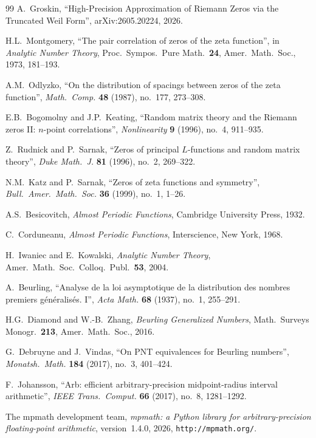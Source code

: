 \documentclass[11pt]{article}
\begin{document}
\begin{thebibliography}{99}
A.~Groskin,
``High-Precision Approximation of Riemann Zeros via the Truncated Weil
Form'',
arXiv:2605.20224, 2026.

H.L.~Montgomery,
``The pair correlation of zeros of the zeta function'',
in \emph{Analytic Number Theory}, Proc.\ Sympos.\ Pure Math.\ \textbf{24},
Amer.\ Math.\ Soc., 1973, 181--193.

A.M.~Odlyzko,
``On the distribution of spacings between zeros of the zeta function'',
\emph{Math.\ Comp.} \textbf{48} (1987), no.~177, 273--308.

E.B.~Bogomolny and J.P.~Keating,
``Random matrix theory and the Riemann zeros II: $n$-point correlations'',
\emph{Nonlinearity} \textbf{9} (1996), no.~4, 911--935.

Z.~Rudnick and P.~Sarnak,
``Zeros of principal $L$-functions and random matrix theory'',
\emph{Duke Math.\ J.} \textbf{81} (1996), no.~2, 269--322.

N.M.~Katz and P.~Sarnak,
``Zeros of zeta functions and symmetry'',
\emph{Bull.\ Amer.\ Math.\ Soc.} \textbf{36} (1999), no.~1, 1--26.

A.S.~Besicovitch,
\emph{Almost Periodic Functions},
Cambridge University Press, 1932.

C.~Corduneanu,
\emph{Almost Periodic Functions},
Interscience, New York, 1968.

H.~Iwaniec and E.~Kowalski,
\emph{Analytic Number Theory},
Amer.\ Math.\ Soc.\ Colloq.\ Publ.\ \textbf{53}, 2004.

A.~Beurling,
``Analyse de la loi asymptotique de la distribution des nombres premiers
g\'en\'eralis\'es. I'',
\emph{Acta Math.} \textbf{68} (1937), no.~1, 255--291.

H.G.~Diamond and W.-B.~Zhang,
\emph{Beurling Generalized Numbers},
Math.\ Surveys Monogr.\ \textbf{213}, Amer.\ Math.\ Soc., 2016.

G.~Debruyne and J.~Vindas,
``On PNT equivalences for Beurling numbers'',
\emph{Monatsh.\ Math.} \textbf{184} (2017), no.~3, 401--424.

F.~Johansson,
``Arb: efficient arbitrary-precision midpoint-radius interval arithmetic'',
\emph{IEEE Trans.\ Comput.} \textbf{66} (2017), no.~8, 1281--1292.

The mpmath development team,
\emph{mpmath: a Python library for arbitrary-precision floating-point
arithmetic}, version~1.4.0, 2026, \texttt{http://mpmath.org/}.


\end{thebibliography}
\end{document}
